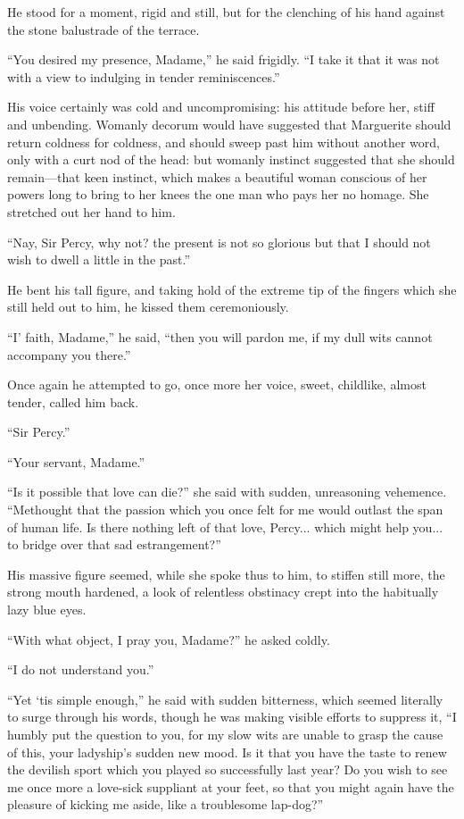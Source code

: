 He stood for a moment, rigid and still, but for the clenching of his hand against the stone balustrade of the terrace.

\enquote{You desired my presence, Madame,} he said frigidly. \enquote{I take it that it was not with a view to indulging in tender reminiscences.}

His voice certainly was cold and uncompromising: his attitude before her, stiff and unbending. Womanly decorum would have suggested that Marguerite should return coldness for coldness, and should sweep past him without another word, only with a curt nod of the head: but womanly instinct suggested that she should remain---that keen instinct, which makes a beautiful woman conscious of her powers long to bring to her knees the one man who pays her no homage. She stretched out her hand to him.

\enquote{Nay, Sir Percy, why not? the present is not so glorious but that I should not wish to dwell a little in the past.}

He bent his tall figure, and taking hold of the extreme tip of the fingers which she still held out to him, he kissed them ceremoniously.

\enquote{I’ faith, Madame,} he said, \enquote{then you will pardon me, if my dull wits cannot accompany you there.}

Once again he attempted to go, once more her voice, sweet, childlike, almost tender, called him back.

\enquote{Sir Percy.}

\enquote{Your servant, Madame.}

\enquote{Is it possible that love can die?} she said with sudden, unreasoning vehemence. \enquote{Methought that the passion which you once felt for me would outlast the span of human life. Is there nothing left of that love, Percy... which might help you... to bridge over that sad estrangement?}

His massive figure seemed, while she spoke thus to him, to stiffen still more, the strong mouth hardened, a look of relentless obstinacy crept into the habitually lazy blue eyes.

\enquote{With what object, I pray you, Madame?} he asked coldly.

\enquote{I do not understand you.}

\enquote{Yet `tis simple enough,} he said with sudden bitterness, which seemed literally to surge through his words, though he was making visible efforts to suppress it, \enquote{I humbly put the question to you, for my slow wits are unable to grasp the cause of this, your ladyship's sudden new mood. Is it that you have the taste to renew the devilish sport which you played so successfully last year? Do you wish to see me once more a love-sick suppliant at your feet, so that you might again have the pleasure of kicking me aside, like a troublesome lap-dog?}

